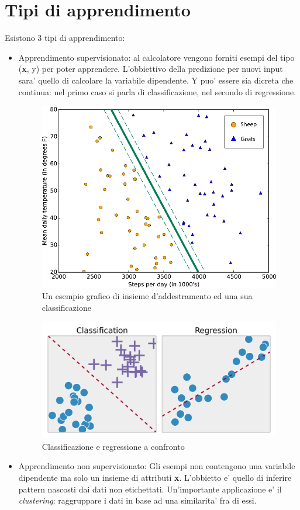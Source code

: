 \section*{Tipi di apprendimento}
Esistono 3 tipi di apprendimento:
\begin{itemize}
	\item Apprendimento supervisionato: al calcolatore vengono forniti esempi del tipo (\textbf{x}, y) per poter apprendere. L'obbiettivo della predizione per nuovi input sara' quello di calcolare la variabile dipendente. Y puo' essere sia dicreta che continua: nel primo caso si parla di classificazione, nel secondo di regressione.
	
	
	\begin{figure}[H]
		\centering
		\includegraphics[width=0.7\linewidth]{img/supervised_learning_example}
		\caption{Un esempio grafico di insieme d'addestramento ed una sua classificazione}
		\label{fig:supervisedlearningexample}
	\end{figure}
	
	
	\begin{figure}[H]
		\centering
		\includegraphics[width=0.7\linewidth]{img/Classification_Regression}
		\caption{Classificazione e regressione a confronto}
		\label{fig:classificationregression}
	\end{figure}

	\item Apprendimento non supervisionato: Gli esempi non contengono una variabile dipendente ma solo un insieme di attributi \textbf{x}. L'obbietto e' quello di inferire pattern nascosti dai dati non etichettati. Un'importante applicazione e' il \textit{clustering}: raggruppare i dati in base ad una similarita' fra di essi.
	

\end{itemize}
